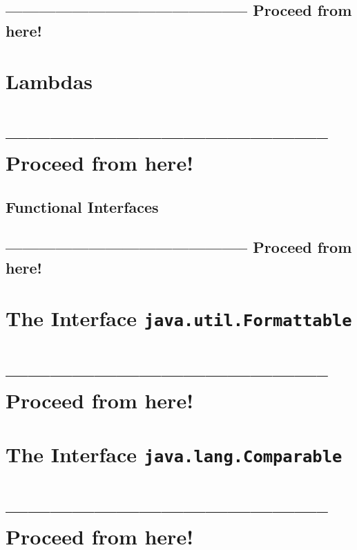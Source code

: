 \documentclass[11pt,a4paper, titlepage, parskip=half, headsepline, footsepline, cleardoublepage=current, headheight=1cm]{scrbook}
\begin{document}
\subsection{-------------------------------------------- Proceed from here!}
\lipsum[5]

\section{Lambdas}\label{sec:Lambdas}
\section{-------------------------------------------- Proceed from here!}
\lipsum[5]

\subsection{Functional Interfaces}\label{sec:FunctionalInterfaces}
\subsection{-------------------------------------------- Proceed from here!}
\lipsum[5]

\section{The Interface \lstinline|java.util.Formattable|}\label{sec:FormattableInterface}
\section{-------------------------------------------- Proceed from here!}

\autocite{ORACLE_DOC_STRING_CLASS}
\autocite{ORACLE_DOC_STRINGBUFFER_CLASS}
\autocite{ORACLE_DOC_STRINGBUILDER_CLASS}
\autocite{ORACLE_DOC_STRINGJOINER_CLASS}
\autocite{ORACLE_DOC_FORMATTER_CLASS}
\autocite{ORACLE_DOC_FORMATTABLE_INTERFACE}

\lipsum[1]

\section{The Interface \lstinline|java.lang.Comparable|}\label{sec:ComparableInterface}
\section{-------------------------------------------- Proceed from here!}
\lipsum[5]
\end{document}
